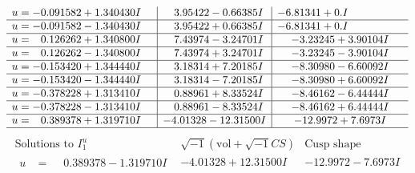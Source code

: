 \documentclass[1p]{elsarticle_modified}
\theoremstyle{definition}
\newcommand{\I}{\sqrt{-1}}
\begin{document}
$$\begin{array}{c|c|c}
\begin{aligned}
u &= -0.091582 + 1.340430 I\end{aligned}
 & \phantom{-}3.95422 - 0.66385 I & -6.81341 + 0. I\phantom{ +0.000000I} \\ \hline\begin{aligned}
u &= -0.091582 - 1.340430 I\end{aligned}
 & \phantom{-}3.95422 + 0.66385 I & -6.81341 + 0. I\phantom{ +0.000000I} \\ \hline\begin{aligned}
u &= \phantom{-}0.126262 + 1.340800 I\end{aligned}
 & \phantom{-}7.43974 - 3.24701 I & -3.23245 + 3.90104 I \\ \hline\begin{aligned}
u &= \phantom{-}0.126262 - 1.340800 I\end{aligned}
 & \phantom{-}7.43974 + 3.24701 I & -3.23245 - 3.90104 I \\ \hline\begin{aligned}
u &= -0.153420 + 1.344440 I\end{aligned}
 & \phantom{-}3.18314 + 7.20185 I & -8.30980 - 6.60092 I \\ \hline\begin{aligned}
u &= -0.153420 - 1.344440 I\end{aligned}
 & \phantom{-}3.18314 - 7.20185 I & -8.30980 + 6.60092 I \\ \hline\begin{aligned}
u &= -0.378228 + 1.313410 I\end{aligned}
 & \phantom{-}0.88961 + 8.33524 I & -8.46162 - 6.44444 I \\ \hline\begin{aligned}
u &= -0.378228 - 1.313410 I\end{aligned}
 & \phantom{-}0.88961 - 8.33524 I & -8.46162 + 6.44444 I \\ \hline\begin{aligned}
u &= \phantom{-}0.389378 + 1.319710 I\end{aligned}
 & -4.01328 - 12.31500 I & -12.9972 + 7.6973 I\\
 \hline 
 \end{array}$$\newpage$$\begin{array}{c|c|c}  
\text{Solutions to }I^u_{1}& \I (\text{vol} + \sqrt{-1}CS) & \text{Cusp shape}\\
 \hline 
\begin{aligned}
u &= \phantom{-}0.389378 - 1.319710 I\end{aligned}
 & -4.01328 + 12.31500 I & -12.9972 - 7.6973 I \\ \hline\begin{aligned}

\end{aligned}
\end{array}$$
\end{document}
